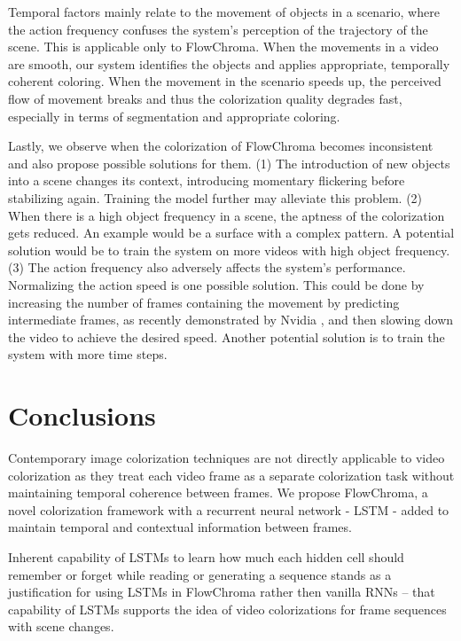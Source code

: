 \documentclass[10pt,twocolumn,letterpaper]{article}
\begin{document}
Temporal factors mainly relate to the movement of objects in a scenario, where the action frequency confuses the system's perception of the trajectory of the scene. This is applicable only to FlowChroma. When the movements in a video are smooth, our system identifies the objects and applies appropriate, temporally coherent coloring. When the movement in the scenario speeds up, the perceived flow of movement breaks and thus the colorization quality degrades fast, especially in terms of segmentation and appropriate coloring.

Lastly, we observe when the colorization of FlowChroma becomes inconsistent and also propose possible solutions for them. (1) The introduction of new objects into a scene changes its context, introducing momentary flickering before stabilizing again. Training the model further may alleviate this problem. (2) When there is a high object frequency in a scene, the aptness of the colorization gets reduced. An example would be a surface with a complex pattern. A potential solution would be to train the system on more videos with high object frequency. (3) The action frequency also adversely affects the system's performance. Normalizing the action speed is one possible solution. This could be done by increasing the number of frames containing the movement by predicting intermediate frames, as recently demonstrated by Nvidia \cite{DBLP:journals/corr/abs-1712-00080}, and then slowing down the video to achieve the desired speed. Another potential solution is to train the system with more time steps.

\section{Conclusions}

Contemporary image colorization techniques are not directly applicable to video colorization as they treat each video frame as a separate colorization task without maintaining temporal coherence between frames. We propose FlowChroma, a novel colorization framework with a recurrent neural network - LSTM - added to maintain temporal and contextual information between frames.

Inherent capability of LSTMs to learn how much each hidden cell should remember or forget while reading or generating a sequence stands as a justification for using LSTMs in FlowChroma rather then vanilla RNNs -- that capability of LSTMs supports the idea of video colorizations for frame sequences with scene changes.
\end{document}

